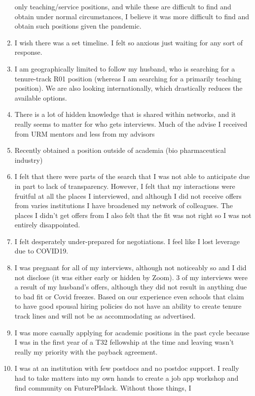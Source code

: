 \documentclass[]{article}
\begin{document}
\begin{enumerate}
  only teaching/service positions, and while these are difficult to find
  and obtain under normal circumstances, I believe it was more difficult
  to find and obtain such positions given the pandemic.
\item
  I wish there was a set timeline. I felt so anxious just waiting for
  any sort of response.
\item
  I am geographically limited to follow my husband, who is searching for
  a tenure-track R01 position (whereas I am searching for a primarily
  teaching position). We are also looking internationally, which
  drastically reduces the available options.
\item
  There is a lot of hidden knowledge that is shared within networks, and
  it really seems to matter for who gets interviews. Much of the advise
  I received from URM mentors and less from my advisors
\item
  Recently obtained a position outside of academia (bio pharmaceutical
  industry)
\item
  I felt that there were parts of the search that I was not able to
  anticipate due in part to lack of transparency. However, I felt that
  my interactions were fruitful at all the places I interviewed, and
  although I did not receive offers from varies institutions I have
  broadened my network of colleagues. The places I didn't get offers
  from I also felt that the fit was not right so I was not entirely
  disappointed.
\item
  I felt desperately under-prepared for negotiations. I feel like I lost
  leverage due to COVID19.
\item
  I was pregnant for all of my interviews, although not noticeably so
  and I did not disclose (it was either early or hidden by Zoom). 3 of
  my interviews were a result of my husband's offers, although they did
  not result in anything due to bad fit or Covid freezes. Based on our
  experience even schools that claim to have good spousal hiring
  policies do not have an ability to create tenure track lines and will
  not be as accommodating as advertised.
\item
  I was more casually applying for academic positions in the past cycle
  because I was in the first year of a T32 fellowship at the time and
  leaving wasn't really my priority with the payback agreement.
\item
  I was at an institution with few postdocs and no postdoc support. I
  really had to take matters into my own hands to create a job app
  workshop and find community on FuturePIslack. Without those things, I

\end{enumerate}
\end{document}
